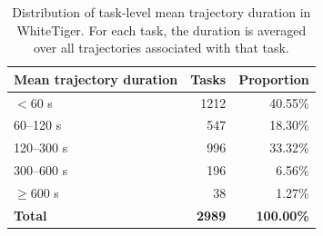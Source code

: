 \begin{table}[t]
\centering
\caption{Distribution of task-level mean trajectory duration in WhiteTiger. For each task, the duration is averaged over all trajectories associated with that task.}
\label{tab:task-duration}
\small
\begin{tabular}{lrr}
\toprule
Mean trajectory duration & Tasks & Proportion \\
\midrule
$<60$ s & 1212 & 40.55\% \\
60--120 s & 547 & 18.30\% \\
120--300 s & 996 & 33.32\% \\
300--600 s & 196 & 6.56\% \\
$\geq 600$ s & 38 & 1.27\% \\
\textbf{Total} & \textbf{2989} & \textbf{100.00\%} \\
\bottomrule
\end{tabular}
\end{table}

